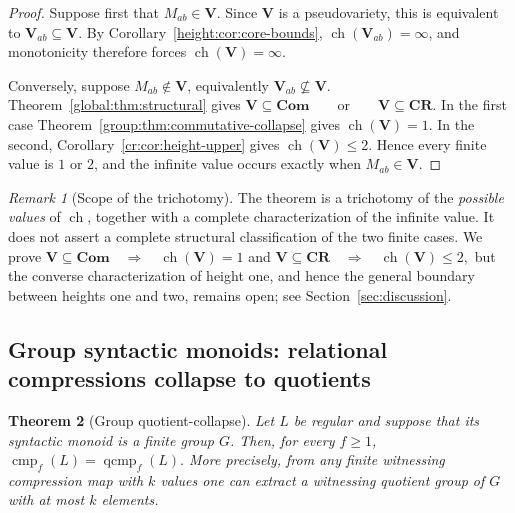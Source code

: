 \documentclass[10pt,a4paper]{article}
\newtheorem{theorem}{Theorem}[section]
\theoremstyle{definition}
\theoremstyle{remark}
\newtheorem{remark}[theorem]{Remark}
\newcommand{\cmp}{\operatorname{cmp}}
\newcommand{\qcmp}{\operatorname{qcmp}}
\begin{document}
\begin{proof}
Suppose first that \(M_{ab}\in\mathbf V\).  Since \(\mathbf V\) is a
pseudovariety, this is equivalent to
\(\mathbf V_{ab}\subseteq\mathbf V\).  By
Corollary~\ref{height:cor:core-bounds},
\(\operatorname{ch}(\mathbf V_{ab})=\infty\), and monotonicity therefore
forces
\(\operatorname{ch}(\mathbf V)=\infty.\)

Conversely, suppose \(M_{ab}\notin\mathbf V\), equivalently
\(\mathbf V_{ab}\not\subseteq\mathbf V\).
Theorem~\ref{global:thm:structural} gives
\(\mathbf V\subseteq\mathbf{Com} \qquad\text{or}\qquad \mathbf V\subseteq\mathbf{CR}.\)
In the first case
Theorem~\ref{group:thm:commutative-collapse} gives
\(\operatorname{ch}(\mathbf V)=1\).
In the second,
Corollary~\ref{cr:cor:height-upper} gives
\(\operatorname{ch}(\mathbf V)\le2\).
Hence every finite value is \(1\) or \(2\), and the infinite value occurs
exactly when \(M_{ab}\in\mathbf V\).
\end{proof}

\begin{remark}[Scope of the trichotomy]
The theorem is a trichotomy of the \emph{possible values} of
\(\operatorname{ch}\), together with a complete characterization of the
infinite value.  It does not assert a complete structural classification of
the two finite cases.  We prove
\(\mathbf V\subseteq\mathbf{Com} \quad\Longrightarrow\quad \operatorname{ch}(\mathbf V)=1\)
and
\(\mathbf V\subseteq\mathbf{CR} \quad\Longrightarrow\quad \operatorname{ch}(\mathbf V)\le2,\)
but the converse characterization of height one, and hence the general
boundary between heights one and two, remains open; see
Section~\ref{sec:discussion}.
\end{remark}




\subsection{Group syntactic monoids: relational compressions collapse to quotients}

\begin{theorem}[Group quotient-collapse]
\label{group:thm:quotient-collapse}
Let \(L\) be regular and suppose that its syntactic monoid is a finite group
\(G\). Then, for every \(f\ge1\), \(\cmp_f(L)=\qcmp_f(L).\) More precisely, from any finite witnessing compression map with \(k\) values one
can extract a witnessing quotient group of \(G\) with at most \(k\) elements.
\end{theorem}
\end{document}
